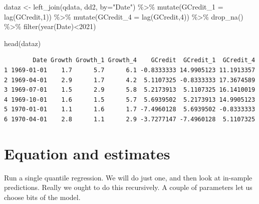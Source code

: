 \documentclass[
  letterpaper,
]{book}
\newenvironment{Shaded}{\begin{snugshade}}{\end{snugshade}}
\newcommand{\AttributeTok}[1]{\textcolor[rgb]{0.40,0.45,0.13}{#1}}
\newcommand{\DecValTok}[1]{\textcolor[rgb]{0.68,0.00,0.00}{#1}}
\newcommand{\FunctionTok}[1]{\textcolor[rgb]{0.28,0.35,0.67}{#1}}
\newcommand{\NormalTok}[1]{\textcolor[rgb]{0.00,0.23,0.31}{#1}}
\newcommand{\OtherTok}[1]{\textcolor[rgb]{0.00,0.23,0.31}{#1}}
\newcommand{\SpecialCharTok}[1]{\textcolor[rgb]{0.37,0.37,0.37}{#1}}
\newcommand{\StringTok}[1]{\textcolor[rgb]{0.13,0.47,0.30}{#1}}
\begin{document}
\begin{Shaded}
\begin{Highlighting}[]
\NormalTok{dataz }\OtherTok{\textless{}{-}} \FunctionTok{left\_join}\NormalTok{(qdata, dd2, }\AttributeTok{by=}\StringTok{"Date"}\NormalTok{) }\SpecialCharTok{\%\textgreater{}\%} 
  \FunctionTok{mutate}\NormalTok{(}\AttributeTok{GCredit\_1 =} \FunctionTok{lag}\NormalTok{(GCredit,}\DecValTok{1}\NormalTok{)) }\SpecialCharTok{\%\textgreater{}\%} 
  \FunctionTok{mutate}\NormalTok{(}\AttributeTok{GCredit\_4 =} \FunctionTok{lag}\NormalTok{(GCredit,}\DecValTok{4}\NormalTok{)) }\SpecialCharTok{\%\textgreater{}\%} 
  \FunctionTok{drop\_na}\NormalTok{() }\SpecialCharTok{\%\textgreater{}\%}
  \FunctionTok{filter}\NormalTok{(}\FunctionTok{year}\NormalTok{(Date)}\SpecialCharTok{\textless{}}\DecValTok{2021}\NormalTok{)}

\FunctionTok{head}\NormalTok{(dataz)}
\end{Highlighting}
\end{Shaded}

\begin{verbatim}
        Date Growth Growth_1 Growth_4    GCredit  GCredit_1  GCredit_4
1 1969-01-01    1.7      5.7      6.1 -0.8333333 14.9905123 11.1913357
2 1969-04-01    2.9      1.7      4.2  5.1107325 -0.8333333 17.3674589
3 1969-07-01    1.5      2.9      5.8  5.2173913  5.1107325 16.1410019
4 1969-10-01    1.6      1.5      5.7  5.6939502  5.2173913 14.9905123
5 1970-01-01    1.1      1.6      1.7 -7.4960128  5.6939502 -0.8333333
6 1970-04-01    2.8      1.1      2.9 -3.7277147 -7.4960128  5.1107325
\end{verbatim}

\hypertarget{equation-and-estimates}{%
\section{Equation and estimates}\label{equation-and-estimates}}

Run a single quantile regression. We will do just one, and then look at
in-sample predictions. Really we ought to do this recursively. A couple
of parameters let us choose bits of the model.
\end{document}
